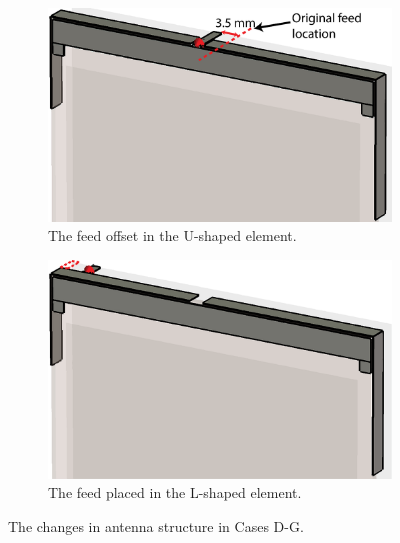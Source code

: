 \begin{figure}[H]
    \centering
    \begin{subfigure}[b]{0.49\textwidth}
        \includegraphics[width=\textwidth]{img/concept3_u_offset.eps}
        \caption{The feed offset in the U-shaped element.}
        \label{fig:concept3_u_offset}
    \end{subfigure}
    \begin{subfigure}[b]{0.49\textwidth}
        \includegraphics[width=\textwidth]{img/concept_l_feed.eps}
        \caption{The feed placed in the L-shaped element.}
        \label{fig:concept_l_feed}
    \end{subfigure}
    \caption{The changes in antenna structure in Cases D-G.}
    \label{fig:concept_offsets}
    \vspace{-10pt}
\end{figure}


